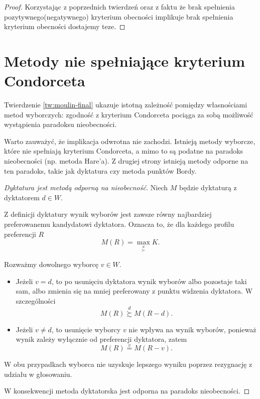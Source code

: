 \documentclass[12pt,a4paper]{mwrep}
\begin{document}
	\begin{proof}
		Korzystając z poprzednich twierdzeń oraz z faktu że brak spełnienia pozytywnego(negatywnego) kryterium obecności implikuje brak spełnienia kryterium obecności dostajemy teze.
	\end{proof}
	
	
	
	
	
	
	
	
	
	

	\section{Metody nie spełniające kryterium Condorceta}
	
	Twierdzenie \ref{tw:moulin-final} ukazuje istotną zależność pomiędzy własnościami metod wyborczych: zgodność z kryterium Condorceta pociąga za sobą możliwość wystąpienia paradoksu nieobecności.
	
	\medskip
	
	Warto zauważyć, że implikacja odwrotna nie zachodzi. Istnieją metody wyborcze, które nie spełniają kryterium Condorceta, a mimo to są podatne na paradoks nieobecności (np. metoda Hare'a). Z drugiej strony istnieją metody odporne na ten paradoks, takie jak dyktatura czy metoda punktów Bordy.
	
	\begin{proof}[Dyktatura jest metodą odporną na nieobecność]
		
		Niech \(M\) będzie dyktaturą z dyktatorem \(d \in W\).
		
		Z definicji dyktatury wynik wyborów jest zawsze równy najbardziej preferowanemu kandydatowi dyktatora. Oznacza to, że dla każdego profilu preferencji \(R\)
		\[
		M(R)=\max_{\overset{d}{\succ}} K.
		\]
		
		Rozważmy dowolnego wyborcę \(v \in W\).
		
		\begin{itemize}
			\item Jeżeli \(v=d\), to po usunięciu dyktatora wynik wyborów albo pozostaje taki sam, albo zmienia się na mniej preferowany z punktu widzenia dyktatora. W szczególności
			\[
			M(R) \overset{d}{\succsim} M(R-d).
			\]
			
			\item Jeżeli \(v\neq d\), to usunięcie wyborcy \(v\) nie wpływa na wynik wyborów, ponieważ wynik zależy wyłącznie od preferencji dyktatora, zatem
			\[
			M(R) \overset{v}{=} M(R-v).
			\]
		\end{itemize}
		
		W obu przypadkach wyborca nie uzyskuje lepszego wyniku poprzez rezygnację z udziału w głosowaniu.
		
		W konsekwencji metoda dyktatorska jest odporna na paradoks nieobecności.
	\end{proof}
	
\end{document}
